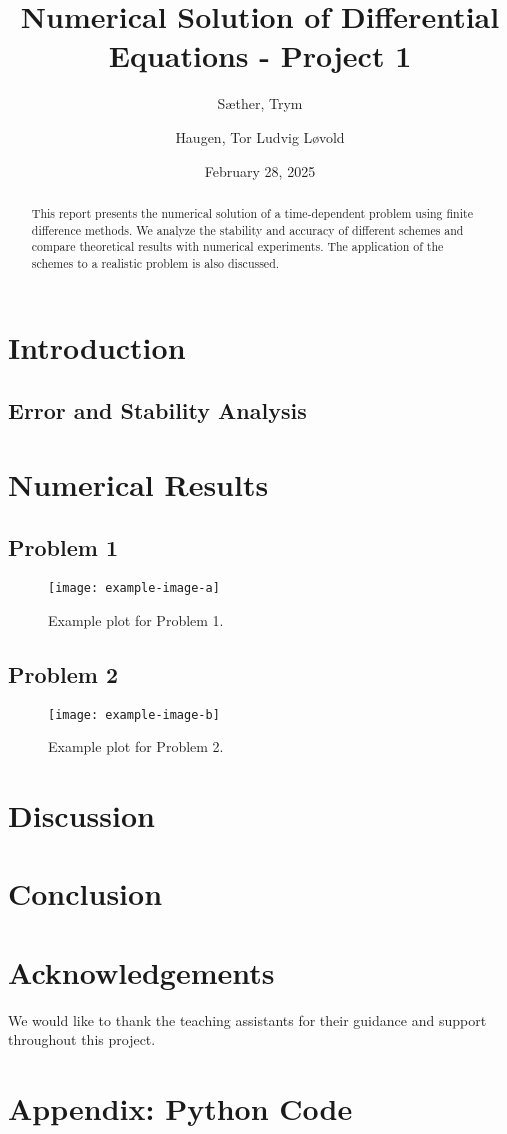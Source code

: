 \documentclass[a4paper,12pt]{report}
\title{Numerical Solution of Differential Equations - Project 1}
\author[1]{Sæther, Trym}
\author[1]{Haugen, Tor Ludvig Løvold}
\affil[1]{Department of Mathematical Sciences, NTNU}
\date{February 28, 2025}
\begin{document}
\maketitle

\begin{abstract}
This report presents the numerical solution of a time-dependent problem using finite difference methods. We analyze the stability and accuracy of different schemes and compare theoretical results with numerical experiments. The application of the schemes to a realistic problem is also discussed.
\end{abstract}

\section{Introduction}


\subsection{Error and Stability Analysis}
\lipsum[6]

\section{Numerical Results}
\subsection{Problem 1}
\lipsum[7]
\begin{figure}[H]
    \centering
    \texttt{[image: example-image-a]}
    \caption{Example plot for Problem 1.}
    \label{fig:problem1}
\end{figure}

\subsection{Problem 2}
\lipsum[8]
\begin{figure}[H]
    \centering
    \texttt{[image: example-image-b]}
    \caption{Example plot for Problem 2\cite{nocedalwright2006numerical}.}
    \label{fig:problem2}
\end{figure}

\section{Discussion}
\lipsum[9]

\section{Conclusion}
\lipsum[10]

\section*{Acknowledgements}
We would like to thank the teaching assistants for their guidance and support throughout this project.




\appendix
\section{Appendix: Python Code}
\inputminted{python}{code/code.py}
\end{document}
